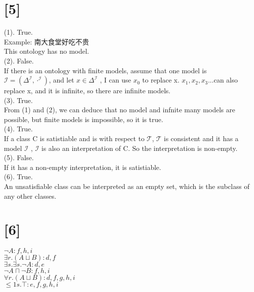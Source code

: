 \documentclass[a4paper,UTF8]{article}
\begin{document}
\section*{[5]}
(1). True.\\
Example: 南大食堂好吃不贵\\
This ontology has no model.\\
(2). False.\\
If there is an ontology with finite models, 
assume that one model is $\mathcal{I} = (\Delta^\mathcal{I} , \cdot ^\mathcal{I} )$, and let $x\in \Delta^\mathcal{I}$ , I can use $x_0$ to replace x. 
$x_1,x_2,x_3...$can also replace x, and it is infinite, so there are infinite models.\\
(3). True.\\
From (1) and (2), we can deduce that no model and infnite many models are possible,
but finite models is impossible, so it is true.\\
(4). True.\\
If a class C is satistiable and is with respect to $\mathcal{T}$, $\mathcal{T} $ is consistent and it has a model $\mathcal{I}$ , 
$\mathcal{I} $ is also an interpretation of C. So the interpretation is non-empty.\\
(5). False.\\
If it has a non-empty interpretation, it is satistiable.\\
(6). True.\\
An unsatisfiable class can be interpreted as an empty set, which is the subclass of any other classes.\\

\section*{[6]}
$\lnot A : f,h,i$\\
$\exists r.(A\sqcup B) : d,f$\\
$\exists s.\exists s.\lnot A : d,e$\\
$\lnot A \sqcap \lnot B : f,h,i$\\
$\forall r.(A\sqcup B) : d,f,g,h,i$\\%
$\leq 1s.\top : e,f,g,h,i$\\
\end{document}
